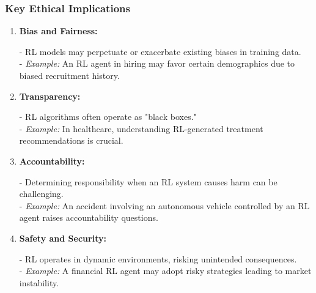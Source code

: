 \documentclass{beamer}
\begin{document}
\begin{frame}[fragile]
    \frametitle{Key Ethical Implications}
    \begin{enumerate}
        \item \textbf{Bias and Fairness:}
            \begin{itemize}
                - RL models may perpetuate or exacerbate existing biases in training data.\\
                - \textit{Example:} An RL agent in hiring may favor certain demographics due to biased recruitment history.
            \end{itemize}
        \item \textbf{Transparency:}
            \begin{itemize}
                - RL algorithms often operate as "black boxes."\\
                - \textit{Example:} In healthcare, understanding RL-generated treatment recommendations is crucial.
            \end{itemize}
        \item \textbf{Accountability:}
            \begin{itemize}
                - Determining responsibility when an RL system causes harm can be challenging.\\
                - \textit{Example:} An accident involving an autonomous vehicle controlled by an RL agent raises accountability questions.
            \end{itemize}
        \item \textbf{Safety and Security:}
            \begin{itemize}
                - RL operates in dynamic environments, risking unintended consequences.\\
                - \textit{Example:} A financial RL agent may adopt risky strategies leading to market instability.
            \end{itemize}
    \end{enumerate}
\end{frame}
\end{document}
